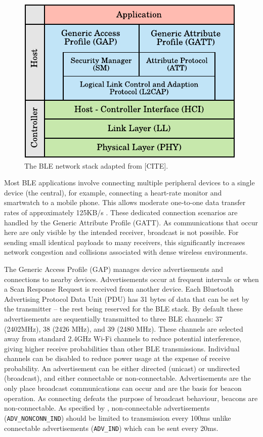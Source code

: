 \documentclass[conference]{IEEEtran} %
\begin{document}
\begin{figure}[H]
    \centering
   	\includegraphics[scale=0.75]{Figures/bt_stack}
    \caption[Bluetooth network stack]{
  The BLE network stack adapted from [CITE]. 
    }
    \label{fig:bt_stack}
\end{figure}

Most BLE applications involve connecting multiple peripheral devices to a single device (the central), for example, connecting a heart-rate monitor and smartwatch to a mobile phone. This allows moderate one-to-one data transfer rates of approximately 125KB/s \cite{BT:LE_OVERVIEW}. These dedicated connection scenarios are handled by the Generic Attribute Profile (GATT). As communications that occur here are only visible by the intended receiver, broadcast is not possible. For sending small identical payloads to many receivers, this significantly increases network congestion and collisions associated with dense wireless environments. 

The Generic Access Profile (GAP) manages device advertisements and connections to nearby devices. Advertisements occur at frequent intervals or when a Scan Response Request is received from another device. Each Bluetooth Advertising Protocol Data Unit (PDU) has 31 bytes of data that can be set by the transmitter -- the rest being reserved for the BLE stack. By default these advertisements are sequentially transmitted to three BLE channels: 37 (2402MHz), 38 (2426 MHz), and 39 (2480 MHz). These channels are selected away from standard 2.4GHz Wi-Fi channels to reduce potential interference, giving higher receive probabilities than other BLE transmissions. Individual channels can be disabled to reduce power usage at the expense of receive probability. An advertisement can be either directed (unicast) or undirected (broadcast), and either connectable or non-connectable. Advertisements are the only place broadcast communications can occur and are the basis for beacon operation. As connecting defeats the purpose of broadcast behaviour, beacons are non-connectable. As specified by \cite{BT:CORE_SPEC}, non-connectable advertisements (\texttt{ADV\_NONCONN\_IND}) should be limited to transmission every 100ms unlike connectable advertisements (\texttt{ADV\_IND}) which can be sent every 20ms.
\end{document}
